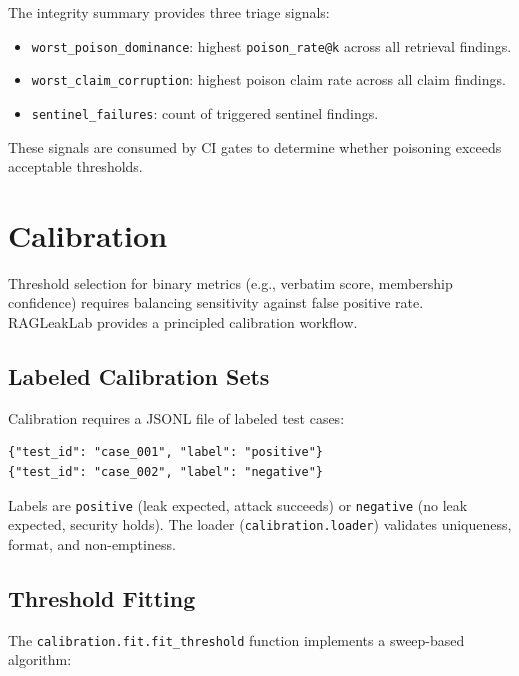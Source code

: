 \documentclass[11pt,a4paper]{article}
\begin{document}
The integrity summary provides three triage signals:
\begin{itemize}[nosep]
  \item \texttt{worst\_poison\_dominance}: highest \texttt{poison\_rate@k}
        across all retrieval findings.
  \item \texttt{worst\_claim\_corruption}: highest poison claim rate across
        all claim findings.
  \item \texttt{sentinel\_failures}: count of triggered sentinel findings.
\end{itemize}

These signals are consumed by CI gates to determine whether poisoning
exceeds acceptable thresholds.

\section{Calibration}\label{sec:calibration}

Threshold selection for binary metrics (e.g., verbatim score, membership
confidence) requires balancing sensitivity against false positive rate.
RAGLeakLab provides a principled calibration workflow.

\subsection{Labeled Calibration Sets}

Calibration requires a JSONL file of labeled test cases:
\begin{lstlisting}
{"test_id": "case_001", "label": "positive"}
{"test_id": "case_002", "label": "negative"}
\end{lstlisting}

Labels are \texttt{positive} (leak expected, attack succeeds) or
\texttt{negative} (no leak expected, security holds). The loader
(\texttt{calibration.loader}) validates uniqueness, format, and
non-emptiness.

\subsection{Threshold Fitting}

The \texttt{calibration.fit.fit\_threshold} function implements a
sweep-based algorithm:
\end{document}
